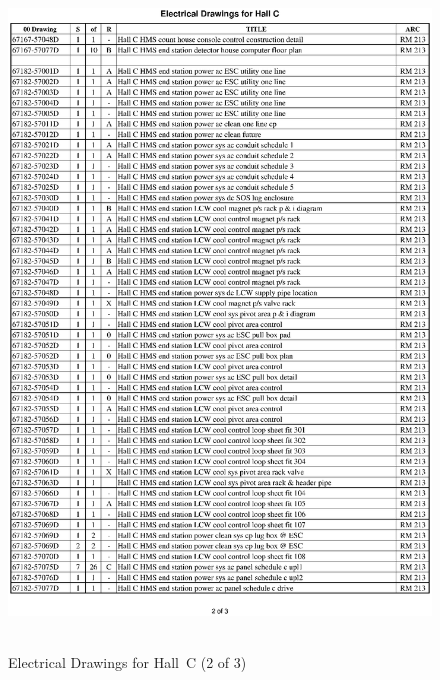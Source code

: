 \clearpage
\begin{figure}
\begin{center}
\includegraphics[height=7in]{introduction/ele2p.ps}
\caption{Electrical Drawings for Hall~C (2 of 3)}
\label{fig:elect_dwgs2}
\end{center}
\end{figure}

